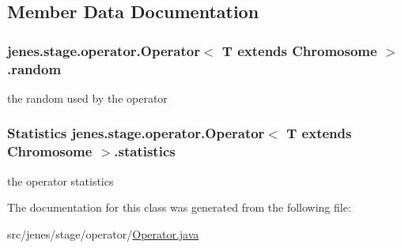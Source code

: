 \subsection{Member Data Documentation}
\hypertarget{classjenes_1_1stage_1_1operator_1_1_operator_3_01_t_01extends_01_chromosome_01_4_af8cbd8837ce95101e238bdcc3dce5573}{
\subsubsection[{random}]{ jenes.\-stage.\-operator.\-Operator$<$ T extends Chromosome $>$.random\hspace{0.3cm}{\ttfamily [protected]}}}\label{classjenes_1_1stage_1_1operator_1_1_operator_3_01_t_01extends_01_chromosome_01_4_af8cbd8837ce95101e238bdcc3dce5573}
the random used by the operator \hypertarget{classjenes_1_1stage_1_1operator_1_1_operator_3_01_t_01extends_01_chromosome_01_4_a45afa214a1e9109845c8f67165942675}{
\subsubsection[{statistics}]{\setlength{\rightskip}{0pt plus 5cm}Statistics jenes.\-stage.\-operator.\-Operator$<$ T extends Chromosome $>$.statistics\hspace{0.3cm}{\ttfamily [protected]}}}\label{classjenes_1_1stage_1_1operator_1_1_operator_3_01_t_01extends_01_chromosome_01_4_a45afa214a1e9109845c8f67165942675}
the operator statistics 

The documentation for this class was generated from the following file\-:\begin{DoxyCompactItemize}
\item 
src/jenes/stage/operator/\hyperlink{_operator_8java}{Operator.\-java}\end{DoxyCompactItemize}
